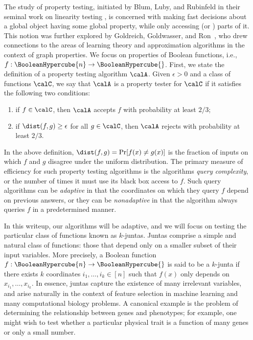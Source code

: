 The study of property testing, initiated by Blum, Luby, and Rubinfeld in their seminal work on linearity testing \cite{DBLP:conf/stoc/BlumLR90}, is concerned with making fast decisions about a global object having some global property, while only accessing (or ) parts of it. This notion was further explored by Goldreich, Goldwasser, and Ron~\cite{DBLP:conf/focs/GoldreichGR96}, who drew connections to the areas of learning theory and approximation algorithms in the context of graph properties.
We focus on properties of Boolean functions, i.e.,  $f:\BooleanHypercube{n} \to \BooleanHypercube{}$.
First, we state the definition of a property testing algorithm $\calA$. Given $\epsilon > 0$ and a class of functions $\calC$, we say that $\calA$ is a property tester for $\calC$ if it satisfies the following two conditions: 
\begin{enumerate}
    \item if $f \in \calC$, then $\calA$ accepts $f$ with probability at least $2/3$;
    \item if $\dist(f,g) \geq \epsilon$ for all $g \in \calC$, then $\calA$ rejects with probability at least $2/3$. 
\end{enumerate}
In the above definition, $\dist(f,g) = \Pr[f(x) \neq g(x)]$ is the fraction of inputs on which $f$ and $g$ disagree under the uniform distribution. The primary measure of efficiency for such property testing algorithms is the algorithms \textit{query complexity}, or the number of times it must use its black box access to $f$. Such query algorithms can be \textit{adaptive} in that the coordinates on which they query $f$ depend on previous answers, or they can be \textit{nonadaptive} in that the algorithm always queries $f$ in a predetermined manner. 

%
In this writeup, our algorithms will be adaptive, and we will focus on testing the particular class of functions known as $k$-juntas. Juntas comprise a simple and natural class of functions: those that depend only on a smaller subset of their input variables. More precisely, a  Boolean function $f: \BooleanHypercube{n} \to \BooleanHypercube{}$ is said to be a $k$-junta if there exists $k$ coordinates $i_1,\ldots,i_k\in [n]$ such that $f(x)$ only depends on $x_{i_1},\ldots,x_{i_k}$. In essence, juntas capture the existence of many irrelevant variables, and arise naturally in the context of feature selection in machine learning and many computational biology problems. A canonical example is the problem of determining the relationship between genes and phenotypes; for example, one might wish to test whether a particular physical trait is a function of many genes or only a small number. 

